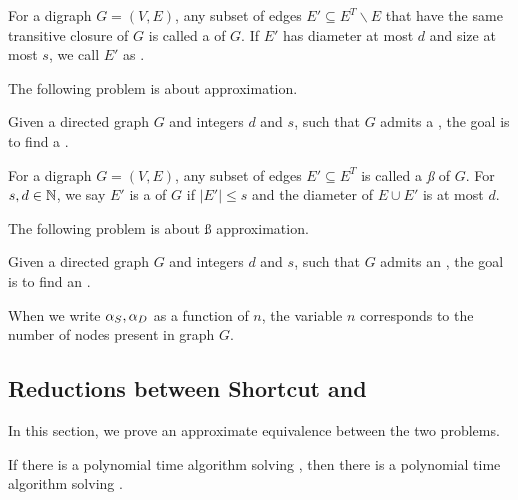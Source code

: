 \begin{definition}[\tc{}]
For a digraph $G=(V,E)$, any subset of edges $E' \subseteq E^T \backslash E$ that have the same transitive closure of $G$ is called a \emph{\tc{}} of $G$. If $E'$ has diameter at most $d$ and size at most $s$, we call $E'$ as .

\end{definition}


The following problem is about \tc{} approximation.


\begin{definition}[\TC{\apxS}{\apxD}]
Given a directed graph $G$ and integers $d$ and $s$, such that $G$ admits a , the goal is to find a .
\end{definition}


\begin{definition}[Shortcut]
For a digraph $G=(V,E)$, any subset of edges $E' \subseteq E^T$ is called a \emph{\ss{}} of $G$. For $s, d \in \mathbb{N}$, we say $E'$ is a \emph{} of $G$ if $|E'| \le s$ and the diameter of $E\cup E'$ is at most $d$.
\end{definition}





The following problem is about \ss{} approximation.

\begin{definition}[\oss{\apxS}{\apxD}]
Given a directed graph $G$ and integers $d$ and $s$, such that $G$ admits an , the goal is to find an .
\end{definition}

When we write $\alpha_S,\alpha_D$ as a function of $n$, the variable $n$ corresponds to the number of nodes present in graph $G$.





\subsection{Reductions between Shortcut and \tc{}}\label{subsec:reductions}

In this section, we prove an approximate equivalence between the two problems. 

\begin{lemma}\label{lem:redTCtoSh}
	If there is a polynomial time algorithm solving \oss{\apxS}{\apxD}, then there is a polynomial time algorithm solving .  
\end{lemma}


